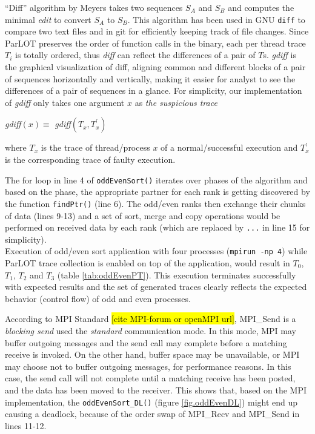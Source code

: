 ``Diff'' algorithm by Meyers \cite{diff-myers} takes two sequences $S_A$ and $S_B$ and computes the minimal \textit{edit} to convert $S_A$ to $S_B$. This algorithm has been used in GNU \texttt{diff} to compare two text files and in git for efficiently keeping track of file changes.
Since ParLOT preserves the order of function calls in the binary, each per thread trace $T_i$ is totally ordered, thus \textit{diff} can reflect the differences of a pair of $T$s. \textit{gdiff} is the graphical visualization of diff, aligning common and different blocks of a pair of sequences horizontally and vertically, making it easier for analyst to see the differences of a pair of sequences in a glance.  
For simplicity, our implementation of \textit{gdiff} only takes one argument $x$ as \textit{the suspicious trace}

\textit{gdiff}$(x) \equiv $ \textit{gdiff}$(T_x,T_x^\prime)$

where $T_x$ is the trace of thread/process $x$ of a normal/successful execution and $T^\prime_x$ is the corresponding trace of faulty execution.



The for loop in line 4 of \texttt{oddEvenSort()} iterates over phases of the algorithm and based on the phase, the appropriate partner for each rank is getting discovered by the function \texttt{findPtr()} (line 6). The odd/even ranks then exchange their chunks of data (lines 9-13) and a set of sort, merge and copy operations would be performed on received data by each rank (which are replaced by \texttt{...} in line 15 for simplicity).
\\

Execution of odd/even sort application with four processes (\texttt{mpirun -np 4}) while ParLOT trace collection is enabled on top of the application, would result in $T_0$, $T_1$, $T_2$ and $T_3$ (table \ref{tab:oddEvenPT}). This execution terminates successfully with expected results and the set of generated traces clearly reflects the expected behavior (control flow) of odd and even processes.
%


According to MPI Standard  \hl{[cite MPI-forum or openMPI url]}, MPI\_Send is a \textit{blocking send} used the \textit{standard} communication mode. In this mode,  MPI may buffer outgoing messages and the send call may complete before a matching receive is invoked. On the other hand, buffer space may be unavailable, or MPI may choose not to buffer outgoing messages, for performance reasons. In this case, the send call will not complete until a matching receive has been posted, and the data has been moved to the receiver. This shows that, based on the MPI implementation, the \texttt{oddEvenSort\_DL()} (figure \ref{fig.oddEvenDL}) might end up causing a deadlock, because of the order swap of MPI\_Recv and MPI\_Send in lines 11-12. 
%


